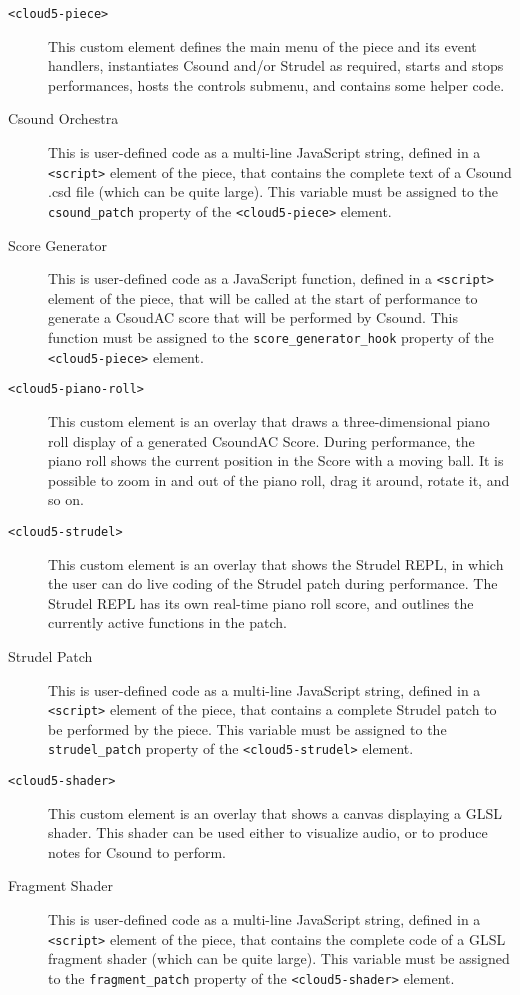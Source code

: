 \documentclass[runningheads,a4paper]{llncs}
\begin{document}
\begin{description}
\item[\texttt{<cloud5-piece>}] This custom element defines the main menu of the piece and its event handlers, instantiates Csound and/or Strudel as required, starts and stops performances, hosts the controls submenu, and contains some helper code.
\item[Csound Orchestra] This is user-defined code as a multi-line JavaScript string, defined in a \texttt{<script>} element of the piece, that contains the complete text of a Csound .csd file (which can be quite large). This variable must be assigned to the \texttt{csound\_patch} property of the \texttt{<cloud5-piece>} element.
\item[Score Generator] This is user-defined code as a JavaScript function, defined in a \texttt{<script>} element of the piece, that will be called at the start of performance to generate a CsoudAC score that will be performed by Csound. This function must be assigned to the \texttt{score\_generator\_hook} property of the \texttt{<cloud5-piece>} element.
\item[\texttt{<cloud5-piano-roll>}] This custom element is an overlay that draws a three-dimensional piano roll display of a generated CsoundAC Score. During performance, the piano roll shows the current position in the Score with a moving ball. It is possible to zoom in and out of the piano roll, drag it around, rotate it, and so on.
\item[\texttt{<cloud5-strudel>}] This custom element is an overlay that shows the Strudel REPL, in which the user can do live coding of the Strudel patch during performance. The Strudel REPL has its own real-time piano roll score, and outlines the currently active functions in the patch.
\item[Strudel Patch] This is user-defined code as a multi-line JavaScript string, defined in a \texttt{<script>} element of the piece, that contains a complete Strudel patch to be performed by the piece. This variable must be assigned to the \texttt{strudel\_patch} property of the \texttt{<cloud5-strudel>} element.
\item[\texttt{<cloud5-shader>}] This  custom element is an overlay that shows a canvas displaying a GLSL shader. This shader can be used either to visualize audio, or to produce notes for Csound to perform.
\item[Fragment Shader] This is user-defined code as a multi-line JavaScript string, defined in a \texttt{<script>} element of the piece, that contains the complete code of a GLSL fragment shader (which can be quite large). This variable must be assigned to the \texttt{fragment\_patch} property of the \texttt{<cloud5-shader>} element.

\end{description}
\end{document}
